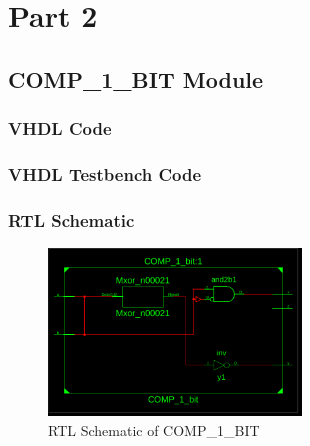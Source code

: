 \documentclass[table ]{article}
\begin{document}
\newpage

\section*{Part 2}

\subsection*{COMP\_1\_BIT Module}

\subsubsection*{VHDL Code}


\begin{center} %
    \lstset{
  caption= COMP\_1\_BIT.vhd, 
  basicstyle=\footnotesize, frame=tb,
  xleftmargin=.2\textwidth, xrightmargin=.2\textwidth
}
    
\end{center}

\subsubsection*{VHDL Testbench Code}


\begin{center} %
    \lstset{
  caption= COMP\_1\_BIT\_tb.vhd, 
  basicstyle=\footnotesize, frame=tb,
  xleftmargin=.2\textwidth, xrightmargin=.2\textwidth
}
    
\end{center}

\subsubsection*{RTL Schematic}

\begin{figure}[H]
    \centering
    \includegraphics[width=0.6\textwidth]{img/COMP_1_BIT_RTL.png}
    \caption{RTL Schematic of COMP\_1\_BIT}
\end{figure}
\end{document}
